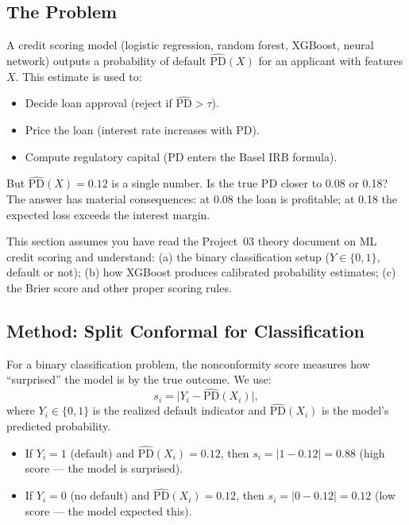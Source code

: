 \documentclass[11pt, a4paper]{article}
\theoremstyle{definition}
\theoremstyle{plain}
\theoremstyle{remark}
\begin{document}
\subsection{The Problem}

A credit scoring model (logistic regression, random forest, XGBoost, neural
network) outputs a probability of default $\widehat{\mathrm{PD}}(X)$ for an
applicant with features $X$.
This estimate is used to:
\begin{itemize}
    \item Decide loan approval (reject if $\widehat{\mathrm{PD}} > \tau$).
    \item Price the loan (interest rate increases with PD).
    \item Compute regulatory capital (PD enters the Basel IRB formula).
\end{itemize}
But $\widehat{\mathrm{PD}}(X) = 0.12$ is a single number.
Is the true PD closer to 0.08 or 0.18?
The answer has material consequences: at 0.08 the loan is profitable; at 0.18
the expected loss exceeds the interest margin.

\begin{prereq}
This section assumes you have read the Project~03 theory document on ML credit
scoring and understand:
(a) the binary classification setup ($Y \in \{0, 1\}$, default or not);
(b) how XGBoost produces calibrated probability estimates;
(c) the Brier score and other proper scoring rules.
\end{prereq}

\subsection{Method: Split Conformal for Classification}

For a binary classification problem, the nonconformity score measures how
``surprised'' the model is by the true outcome.
We use:
\begin{equation}\label{eq:pd-score}
    s_i = \bigl|Y_i - \widehat{\mathrm{PD}}(X_i)\bigr|,
\end{equation}
where $Y_i \in \{0, 1\}$ is the realized default indicator and
$\widehat{\mathrm{PD}}(X_i)$ is the model's predicted probability.

\begin{itemize}
    \item If $Y_i = 1$ (default) and $\widehat{\mathrm{PD}}(X_i) = 0.12$,
          then $s_i = |1 - 0.12| = 0.88$ (high score --- the model is surprised).
    \item If $Y_i = 0$ (no default) and $\widehat{\mathrm{PD}}(X_i) = 0.12$,
          then $s_i = |0 - 0.12| = 0.12$ (low score --- the model expected this).
\end{itemize}
\end{document}
